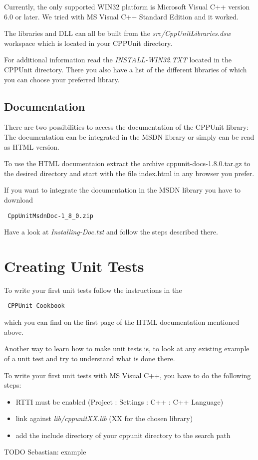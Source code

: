Currently, the only supported WIN32 platform is Microsoft Visual C++ version 6.0 or later.
We tried with MS Visual C++ Standard Edition and it worked.

The libraries and DLL can all be built from the
\textit{src/CppUnitLibraries.dsw} workspace which is located in your CPPUnit directory.

For additional information read the 
\textit{INSTALL-WIN32.TXT} located in the CPPUnit directory. There you also have 
a list of the different libraries of which you can choose your
preferred library.

\subsection{Documentation}
There are two possibilities to access the documentation of the CPPUnit library: 
The documentation can be integrated in the MSDN library or simply can be read as 
HTML version.

To use the HTML documentaion extract the archive cppunit-docs-1.8.0.tar.gz to 
the desired directory and start with the file index.html in any browser you prefer.

If you want to integrate the documentation in the MSDN library you have to 
download \begin{verbatim} CppUnitMsdnDoc-1_8_0.zip \end{verbatim}
Have a look at \textit{Installing-Doc.txt} and follow the steps described there.


\section{Creating Unit Tests}

To write your first unit tests follow the instructions in the
\begin{verbatim} CPPUnit Cookbook \end{verbatim} which you can find on the first page of
the HTML documentation mentioned above.

Another way to learn how to make unit tests is, to look at any existing example 
of a unit test and try to understand what is done there.

To write your first unit tests with MS Visual C++, you have to do the following steps:
\begin{itemize}
\item RTTI must be enabled (Project : Settings : C++ : C++ Language)
\item link against \textit{lib/cppunitXX.lib} (XX for the chosen library)
\item add the include directory of your cppunit directory to the search path
\end{itemize}

TODO Sebastian: example

